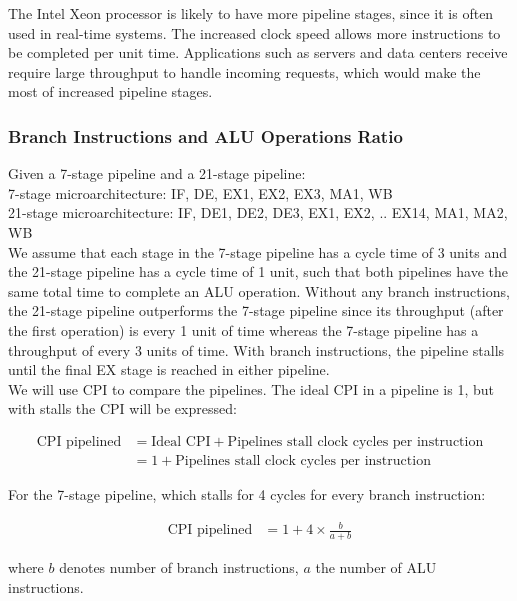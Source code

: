 \documentclass[a4paper, 12pt, oneside]{book}
\begin{document}
The Intel Xeon processor is likely to have more pipeline stages, since it is often used in real-time systems. The increased clock speed allows more instructions to be completed per unit time. Applications such as servers and data centers receive require large throughput to handle incoming requests, which would make the most of increased pipeline stages.

\subsubsection{Branch Instructions and ALU Operations Ratio}
Given a 7-stage pipeline and a 21-stage pipeline:\\

7-stage microarchitecture: IF, DE, EX1, EX2, EX3, MA1, WB\\
21-stage microarchitecture: IF, DE1, DE2, DE3, EX1, EX2, .. EX14, MA1, MA2, WB\\

We assume that each stage in the 7-stage pipeline has a cycle time of 3 units and the 21-stage pipeline has a cycle time of 1 unit, such that both pipelines have the same total time to complete an ALU operation. Without any branch instructions, the 21-stage pipeline outperforms the 7-stage pipeline since its throughput (after the first operation) is every 1 unit of time whereas the 7-stage pipeline has a throughput of every 3 units of time. With branch instructions, the pipeline stalls until the final EX stage is reached in either pipeline.\\

We will use CPI to compare the pipelines. The ideal CPI in a pipeline is 1, but with stalls the CPI will be expressed:

\begin{align*}
  \text{CPI pipelined} & = \text{Ideal CPI} + \text{Pipelines stall clock cycles per instruction} \\
                       & = 1 + \text{Pipelines stall clock cycles per instruction}
\end{align*}

For the 7-stage pipeline, which stalls for 4 cycles for every branch instruction:

\begin{align*}
  \text{CPI pipelined} & = 1 + 4 \times \frac{b}{a+b}
\end{align*}

where $b$ denotes number of branch instructions, $a$ the number of ALU instructions.
\end{document}
